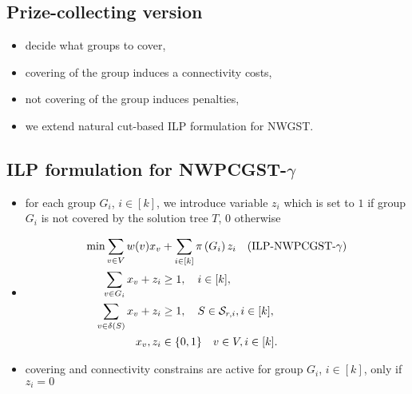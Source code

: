 \documentclass{beamer}
\begin{document}
\subsection*{Prize-collecting version}

\begin{frame}{\insertsection}{\insertsubsection}
    \begin{itemize}[<+->]
        \item decide what groups to cover,
        \item covering of the group induces a connectivity costs,
        \item not covering of the group induces penalties,
        \item we extend natural cut-based ILP formulation for NWGST.
        
    \end{itemize}


\end{frame}


\subsection*{ILP formulation for NWPCGST-$\gamma$}
\begin{frame}{\insertsection}{\insertsubsection}
    \begin{itemize}
        \item for each group $G_i$, $i\in\left[k\right]$, we introduce variable $z_i$ which is set to $1$ if group $G_i$ is not covered by the solution tree $T$, $0$ otherwise
        \item[]
        \begin{align*}
            \mbox{min} \sum_{v\in V}w(v)x_v&\notag + \sum_{i\in\left[k\right]}{\pi\left(G_i\right)z_i} \quad\mbox{(ILP-NWPCGST-$\gamma$)}\\
            \sum_{v\in G_i} x_v + z_i &\geq 1,  \quad i\in[k],\\
            \sum_{v\in \delta(S)} x_v + z_i  &\geq 1, \quad S\in \mathcal{S}_{r,i}, i\in [k],\\
            x_v, z_i & \in \{0,1\} \quad v\in V, i\in [k].
        \end{align*}
        \item covering and connectivity constrains are active for group $G_i$, $i\in [k]$, only if $z_i=0$
    \end{itemize}
\end{frame}
\end{document}
